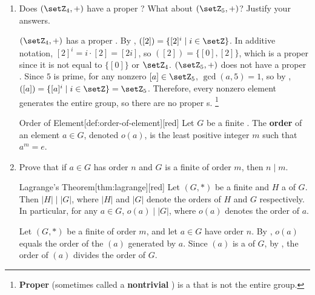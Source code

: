 \begin{enumerate}
  \item Does \((\setZ_{4}, +)\) have a proper ?
  What about \((\setZ_{5}, +)\)?
  Justify your answers.
  \begin{subprove}
    \((\setZ_{4}, +)\) has a proper . 
    By , \(([2]) = \{[2]^{i} \mid i \in \setZ\}\). 
    In additive notation, \([2]^{i} = i \cdot [2] = [2i]\), so 
    \(([2]) = \{[0], [2]\}\), which is a proper  
    since it is not equal to \(\{[0]\}\) or \(\setZ_{4}\).\proofstep
    \((\setZ_{5}, +)\) does not have a proper . 
    Since \(5\) is prime, for any nonzero \([a] \in \setZ_{5}\), \(\gcd(a, 5) = 1\), 
    so by , 
    \(([a]) = \{[a]^{i} \mid i \in \setZ\} = \setZ_{5}\). \proofstep
    Therefore, every nonzero element generates the entire group, 
    so there are no proper s.
    \footnote{\textbf{Proper}  
    (sometimes called a \textbf{nontrivial} ) 
    is a  that is not the entire group.}
  \end{subprove}
  \newpage
  \begin{define}{Order of Element}[def:order-of-element][red]
    Let $G$ be a finite . The \textbf{order} of an 
    element $a \in G$, denoted $o(a)$, is the least positive 
    integer $m$ such that $a^m=e$.
  \end{define}
  \item Prove that if \(a \in G\) has order \(n\) and \(G\) is a finite  of order \(m\), 
  then \(n \mid m\).
  \begin{define}{Lagrange's Theorem}[thm:lagrange][red]
    Let \((G, *)\) be a finite  and \(H\) a  of \(G\). 
    Then \(|H| \mid |G|\), where \(|H|\) and \(|G|\) denote the orders of \(H\) and \(G\) respectively.
    In particular, for any \(a \in G\), \(o(a) \mid |G|\), where \(o(a)\) denotes the order of \(a\).
  \end{define}
  \begin{subprove}
    Let \((G, *)\) be a finite  of order \(m\), and let \(a \in G\) have order \(n\).
    By , \(o(a)\) equals the order of the  \((a)\) generated by \(a\).
    Since \((a)\) is a  of \(G\), by , the order of \((a)\) divides the order of \(G\).

\end{subprove}
\end{enumerate}
